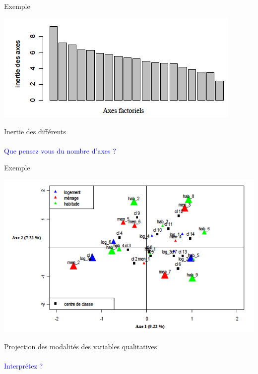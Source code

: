 \documentclass[11pt]{beamer}
\begin{document}
\begin{frame}{Exemple}

 \includegraphics[scale=.5]{ACM2} 
 
 \centering Inertie des différents\\~\\

\textcolor{blue}{Que pensez vous du nombre d'axes ?}

\end{frame}

\begin{frame}{Exemple}

 \includegraphics[scale=.5]{ACM3} 

\centering Projection des modalités des variables qualitatives \\~\\

\textcolor{blue}{Interprétez ?}

\end{frame}
\end{document}
